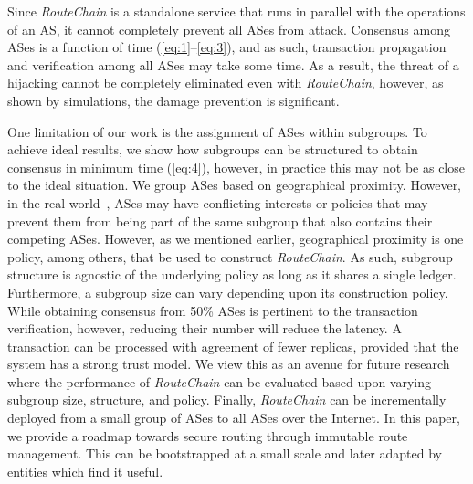 \documentclass[5p]{elsarticle}
\newcommand{\rc}{{{\em RouteChain}}\xspace}
\begin{document}
Since \rc is a standalone service that runs in parallel with the operations of an AS, it cannot completely prevent all ASes from attack. Consensus among ASes is a function of time (\autoref{eq:1}--\autoref{eq:3}), and as such, transaction propagation and verification among all ASes may take some time. As a result, the threat of a hijacking cannot be completely eliminated even with \rc, however, as shown by simulations, the damage prevention is significant.

One limitation of our work is the assignment of ASes within subgroups. To achieve ideal results, we show how subgroups can be structured to obtain consensus in minimum time (\autoref{eq:4}), however, in practice this may not be as close to the ideal situation. We group ASes based on geographical proximity. However, in the real world~\cite{LiangBXH11}, ASes may have conflicting interests or policies that may prevent them from being part of the same subgroup that also contains their competing ASes. However, as we mentioned earlier, geographical proximity is one policy, among others, that be used to construct \rc. As such, subgroup structure is agnostic of the underlying policy as long as it shares a single ledger. Furthermore, a subgroup size can vary depending upon its construction policy. While obtaining consensus from 50\% ASes is pertinent to the transaction verification, however, reducing their number will reduce the latency. A transaction can be processed with agreement of fewer replicas, provided that the system has a strong trust model. We view this as an avenue for future research where the performance of \rc can be evaluated based upon varying subgroup size, structure, and policy. Finally, \rc can be incrementally deployed from a small group of ASes to all ASes over the Internet. In this paper, we provide a roadmap towards secure routing through immutable route management. This can be bootstrapped at a small scale and later adapted by entities which find it useful. 
\end{document}
